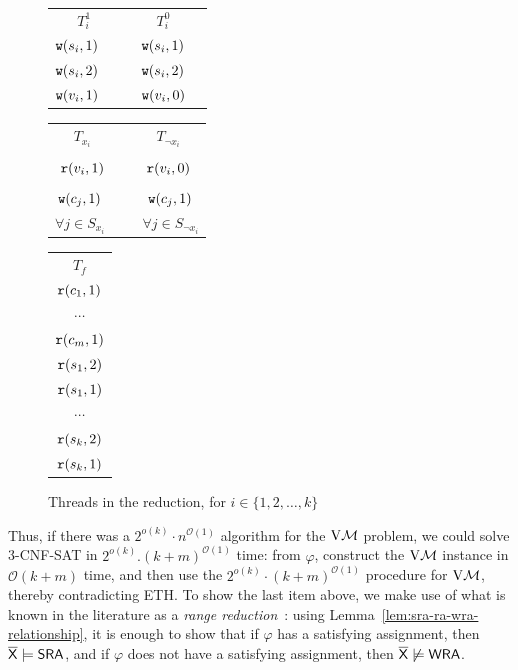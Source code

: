  
\begin{figure}
\footnotesize%

\begin{tabular}{c| c}
    $T_i^1$ & $T_i^0$  \\
    $\mathtt{w}(s_i, 1)$~~&~~$\mathtt{w}(s_i, 1)$~~ \\
    $\mathtt{w}(s_i, 2)$~~&~~$\mathtt{w}(s_i, 2)$~~ \\
    $\mathtt{w}(v_i, 1)$~~&~~$\mathtt{w}(v_i, 0)$~~
\end{tabular}
\hfill
\begin{tabular}{c | c }
    $T_{x_i}$~ & ~$T_{\neg x_i}$ \\
        & \\
        $\mathtt{r}(v_i, 1)$~&~$\mathtt{r}(v_i, 0)$ \\
        & \\
        $\mathtt{w}(c_j, 1)$ ~&~ $\mathtt{w}(c_j, 1)$ \\
        $\forall j \in S_{x_i}$ ~&~  $\forall j \in S_{\neg x_i}$ 
\end{tabular}
\hfill
\begin{tabular}{c}
    $T_f$ \\
    $\mathtt{r}(c_1, 1)$ \\
    $\cdots$ \\
    $\mathtt{r}(c_m, 1)$ \\
    $\mathtt{r}(s_1, 2)$ \\
    $\mathtt{r}(s_1, 1)$ \\
    $\cdots$ \\
    $\mathtt{r}(s_k, 2)$ \\
    $\mathtt{r}(s_k, 1)$ 
\end{tabular}
 \caption{Threads in the reduction, for $i \in \{1, 2, \dots, k\}$ }
   \label{tab:reduction-threads-ra}
\end{figure}

Thus, if there was a $2^{o(k)} \cdot n^{\mathcal{O}(1)}$ algorithm for the $\mathrm{V}\mathcal{M}$ problem, we could solve 3-CNF-SAT in $2^{o(k)}.(k+m)^{\mathcal{O}(1)}$ time: from $\varphi$, construct the $\mathrm{V}\mathcal{M}$ instance in $\mathcal{O}(k + m)$ time, and then use the $2^{o(k)} \cdot (k+m)^{\mathcal{O}(1)}$ procedure for $\mathrm{V}\mathcal{M}$, thereby contradicting ETH. To show the last item above, we make use of what is known in the literature as a \emph{range reduction}~\cite{ChakrabortyKMP24}: using Lemma~\ref{lem:sra-ra-wra-relationship}, it is enough to show that if $\varphi$ has a satisfying assignment, then $\overline{\mathsf{\color{black}X}} \models \mathsf{SRA}$, and if $\varphi$ does not have a satisfying assignment, then $\overline{\mathsf{\color{black}X}} \not \models \mathsf{WRA}$. 

